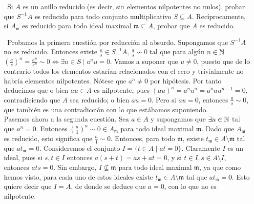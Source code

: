 \documentclass[twoside]{article}
\begin{document}
\begin{ejercicio}{6}\
Si $A$ es un anillo reducido (es decir, sin elementos nilpotentes no
nulos), probar que $S^{-1}A$ es reducido para todo conjunto multiplicativo $S \subseteq A$.
Recíprocamente, si $A_\mathfrak{m}$ es reducido para todo ideal maximal $\mathfrak{m} \subseteq A$, probar que
$A$ es reducido.
\end{ejercicio}
\begin{solucion}\
Probamos la primera cuestión por reducción al absurdo. Supongamos que $S^{-1}A$ no es reducido. Entonces existe $\frac{a}{s}\in S^{-1}A$, $\frac{a}{s}\not\sim 0$ tal que para algún $n\in\mathbb{N}$ $\left(\frac{a}{s}\right)^n=\frac{a^n}{s^n}\sim 0\Leftrightarrow \exists u\in S\mid a^nu=0$. Vamos a suponer que $u\neq 0$, puesto que de lo contrario todos los elementos estarían relacionados con el cero y trivialmente no habría elementos nilpotentes.  Nótese que $a^n\neq 0$ por hipótesis. Por tanto deducimos que o bien $au\in A$ es nilpotente, pues $(au)^n=a^nu^n=a^n u u^{n-1}=0$, contradiciendo que $A$ sea reducido; o bien $au=0$. Pero si $au=0$, entonces $\frac{a}{s}\sim 0$, que también es una contradicción con lo que estábamos suponiendo.\\

Pasemos ahora a la segunda cuestión. Sea $a\in A$ y supongamos que $\exists n\in\mathbb{N}$ tal que $a^n=0$. Entonces $\left(\frac{a}{1}\right)^n\sim 0\in A_\mathfrak{m}$ para todo ideal maximal $\mathfrak{m}$. Dado que $A_\mathfrak{m}$ es reducido, esto significa que $\frac{a}{1}\sim 0$. Entonces, para todo $\mathfrak{m}$, existe $t_\mathfrak{m}\in A\setminus\mathfrak{m}$ tal que $at_\mathfrak{m}=0$. Consideremos el conjunto $I=\{t\in A\mid at=0\}$. Claramente $I$ es un ideal, pues si $s,t\in I$ entonces $a(s+t)=as+at=0$, y si $t\in I,s\in A\setminus I$, entonces $ats=0$. Sin embargo, $I\not\subseteq \mathfrak{m}$ para todo ideal maximal $\mathfrak{m}$, ya que como hemos visto, para cada uno de estos ideales existe $t_\mathfrak{m}\in A\setminus\mathfrak{m}$ tal que $at_\mathfrak{m}=0$. Esto quiere decir que $I=A$, de donde se deduce que $a=0$, con lo que no es nilpotente. 

\end{solucion}
\end{document}
